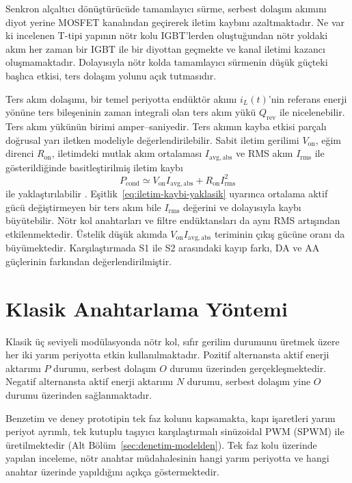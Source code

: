 Senkron alçaltıcı dönüştürücüde tamamlayıcı sürme, serbest dolaşım akımını diyot yerine MOSFET kanalından geçirerek iletim kaybını azaltmaktadır. Ne var ki incelenen T-tipi yapının nötr kolu IGBT'lerden oluştuğundan nötr yoldaki akım her zaman bir IGBT ile bir diyottan geçmekte ve kanal iletimi kazancı oluşmamaktadır. Dolayısıyla nötr kolda tamamlayıcı sürmenin düşük güçteki başlıca etkisi, ters dolaşım yolunu açık tutmasıdır.

Ters akım dolaşımı, bir temel periyotta endüktör akımı $i_L(t)$'nin referans enerji yönüne ters bileşeninin zaman integrali olan ters akım yükü $Q_{\mathrm{rev}}$ ile nicelenebilir. Ters akım yükünün birimi amper--saniyedir. Ters akımın kayba etkisi parçalı doğrusal yarı iletken modeliyle değerlendirilebilir. Sabit iletim gerilimi $V_{\mathrm{on}}$, eğim direnci $R_{\mathrm{on}}$, iletimdeki mutlak akım ortalaması $I_{\mathrm{avg,abs}}$ ve RMS akım $I_{\mathrm{rms}}$ ile gösterildiğinde basitleştirilmiş iletim kaybı
\begin{equation}
  P_{\mathrm{cond}}\simeq V_{\mathrm{on}} I_{\mathrm{avg,abs}}+R_{\mathrm{on}}I_{\mathrm{rms}}^2
  \label{eq:iletim-kaybi-yaklasik}
\end{equation}
ile yaklaştırılabilir \citep{Chen2010,Schweizer2013}. Eşitlik~\eqref{eq:iletim-kaybi-yaklasik} uyarınca ortalama aktif gücü değiştirmeyen bir ters akım bile $I_{\mathrm{rms}}$ değerini ve dolayısıyla kaybı büyütebilir. Nötr kol anahtarları ve filtre endüktansları da aynı RMS artışından etkilenmektedir. Üstelik düşük akımda $V_{\mathrm{on}}I_{\mathrm{avg,abs}}$ teriminin çıkış gücüne oranı da büyümektedir. Karşılaştırmada S1 ile S2 arasındaki kayıp farkı, DA ve AA güçlerinin farkından değerlendirilmiştir.

\section{Klasik Anahtarlama Yöntemi}

Klasik üç seviyeli modülasyonda nötr kol, sıfır gerilim durumunu üretmek üzere her iki yarım periyotta etkin kullanılmaktadır. Pozitif alternansta aktif enerji aktarımı $P$ durumu, serbest dolaşım $O$ durumu üzerinden gerçekleşmektedir. Negatif alternansta aktif enerji aktarımı $N$ durumu, serbest dolaşım yine $O$ durumu üzerinden sağlanmaktadır.

Benzetim ve deney prototipin tek faz kolunu kapsamakta, kapı işaretleri yarım periyot ayrımlı, tek kutuplu taşıyıcı karşılaştırmalı sinüzoidal PWM (SPWM) ile üretilmektedir (Alt Bölüm~\ref{sec:denetim-modelden}). Tek faz kolu üzerinde yapılan inceleme, nötr anahtar müdahalesinin hangi yarım periyotta ve hangi anahtar üzerinde yapıldığını açıkça göstermektedir.

